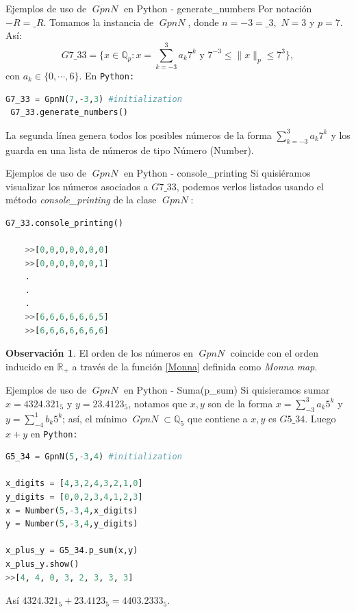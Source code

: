 \documentclass{beamer}
\theoremstyle{definition}
\numberwithin{equation}{section}
\newcommand{\redd}[1]{\textcolor{rkColor}{#1}}
\newtheorem{rr}{\redd{Observación}}
\renewcommand{\leq}{\leqslant}
\newcommand{\R}{\mathbb{R}}
\newcommand{\Q}{\mathbb{Q}}
\newcommand{\Qp}{\mathbb{Q}_p}
\newcommand{\pnorm}[1]{\|#1\|_p}
\DeclareMathOperator{\gpn}{\mathit{{GpnN}}}
\begin{document}
\begin{frame}[fragile]{Ejemplos de uso de $\gpn$ en Python - generate\_numbers }
	Por notación $-{R}=\_R$. Tomamos la instancia de $\gpn$, donde ${n=-3=\_{3},}$ $N=3$ y $p=7$. Así:  
	\begin{equation}\label{finite_number}
	\mathit{G7\_{3}3} = \Big\{x\in \Qp : x = \sum_{k=-3}^{3} a_{k} 7^{k} \text{ y } 7^{-3}\leq\pnorm{x}\leq 7^3\Big\},
	\end{equation}
 con $a_k\in \{0,\cdots,6\}$. En \texttt{Python:}
 \begin{lstlisting}[language = Python, caption = Inicialización de la clase $\mathit{G7\_33}$,basicstyle=\tiny]
 G7_33 = GpnN(7,-3,3) #initialization
 G7_33.generate_numbers()
 \end{lstlisting}
 La segunda línea genera todos los posibles números de la forma $ \sum_{k=-3}^{3} a_{k} 7^{k}$ y los guarda en una lista de números de tipo Número   (Number).
\end{frame}

\begin{frame}[fragile]{Ejemplos de uso de $\gpn$ en Python - console\_printing }
	Si quisiéramos visualizar los números asociados a $\mathit{G7\_{3}3}$, podemos verlos listados usando el método \textit{console\_printing} de la clase $\gpn$:
	\begin{lstlisting}[language = Python, caption = Visualización de números en $\mathit{G7\_33}$,basicstyle=\tiny]
	G7_33.console_printing()
	
	>>[0,0,0,0,0,0,0]
	>>[0,0,0,0,0,0,1]
	.
	.
	.      
	>>[6,6,6,6,6,6,5]
	>>[6,6,6,6,6,6,6]
	\end{lstlisting}
	\begin{rr}
		El orden de los números en $\gpn$ coincide con el orden inducido en $\R_+$ a través de la función \ref{Monna} definida como \textit{Monna map}.
	\end{rr}
\end{frame}

\begin{frame}[fragile]{Ejemplos de uso de $\gpn$ en Python - Suma(p\_sum) }
Si quisieramos sumar $ x =4324.321_5$ y $y=23.4123_5$, notamos que $x,y$ son de la  forma $x=\sum_{-3}^{3}a_k5^k$ y $y=\sum_{-4}^{1}b_k5^k$; así, el mínimo $\gpn\subset\Q_5$ que contiene a $x,y$ es $G5\_{3}4$. Luego $x+y$ en \texttt{Python:}

\begin{lstlisting}[language = Python, caption = suma de números en $\mathit{G5\_34}$, basicstyle=\tiny]
G5_34 = GpnN(5,-3,4) #initialization

x_digits = [4,3,2,4,3,2,1,0]
y_digits = [0,0,2,3,4,1,2,3]
x = Number(5,-3,4,x_digits)
y = Number(5,-3,4,y_digits)

x_plus_y = G5_34.p_sum(x,y)
x_plus_y.show()
>>[4, 4, 0, 3, 2, 3, 3, 3]

\end{lstlisting}
Así $ 4324.321_5+23.4123_5=4403.2333_5$.
\end{frame}
\end{document}
